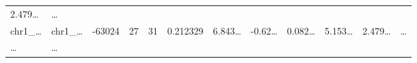 \documentclass[
]{article}
\begin{document}
\begin{longtable}[]{@{}llllllllllll@{}}
\begin{minipage}[t]{0.06\columnwidth}
2.479\ldots{}\strut
\end{minipage} & \begin{minipage}[t]{0.02\columnwidth}\raggedright
\ldots{}\strut
\end{minipage}\tabularnewline
\begin{minipage}[t]{0.06\columnwidth}\raggedright
chr1\_\ldots{}\strut
\end{minipage} & \begin{minipage}[t]{0.06\columnwidth}\raggedright
chr1\_\ldots{}\strut
\end{minipage} & \begin{minipage}[t]{0.06\columnwidth}\raggedright
-63024\strut
\end{minipage} & \begin{minipage}[t]{0.06\columnwidth}\raggedright
27\strut
\end{minipage} & \begin{minipage}[t]{0.06\columnwidth}\raggedright
31\strut
\end{minipage} & \begin{minipage}[t]{0.06\columnwidth}\raggedright
0.212329\strut
\end{minipage} & \begin{minipage}[t]{0.08\columnwidth}\raggedright
6.843\ldots{}\strut
\end{minipage} & \begin{minipage}[t]{0.06\columnwidth}\raggedright
-0.62\ldots{}\strut
\end{minipage} & \begin{minipage}[t]{0.06\columnwidth}\raggedright
0.082\ldots{}\strut
\end{minipage} & \begin{minipage}[t]{0.09\columnwidth}\raggedright
5.153\ldots{}\strut
\end{minipage} & \begin{minipage}[t]{0.06\columnwidth}\raggedright
2.479\ldots{}\strut
\end{minipage} & \begin{minipage}[t]{0.02\columnwidth}\raggedright
\ldots{}\strut
\end{minipage}\tabularnewline
\begin{minipage}[t]{0.06\columnwidth}\raggedright
\ldots{}\strut
\end{minipage} & \begin{minipage}[t]{0.06\columnwidth}\raggedright
\ldots{}\strut
\end{minipage} & \begin{minipage}[t]{0.06\columnwidth}\raggedright

\end{minipage}
\end{longtable}
\end{document}
